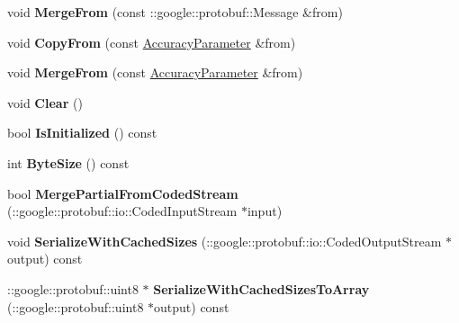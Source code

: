 \begin{DoxyCompactItemize}
\mbox{\label{classcaffe_1_1_accuracy_parameter_a8450a78d36eff284587e92567da36ed6}} 
void {\bfseries Merge\+From} (const \+::google\+::protobuf\+::\+Message \&from)
\item 
\mbox{\label{classcaffe_1_1_accuracy_parameter_acc2fd487a271b0f706f4e8d69ffcee2f}} 
void {\bfseries Copy\+From} (const \mbox{\hyperlink{classcaffe_1_1_accuracy_parameter}{Accuracy\+Parameter}} \&from)
\item 
\mbox{\label{classcaffe_1_1_accuracy_parameter_a3b08be88b78c1291a09c86d1193b34c4}} 
void {\bfseries Merge\+From} (const \mbox{\hyperlink{classcaffe_1_1_accuracy_parameter}{Accuracy\+Parameter}} \&from)
\item 
\mbox{\label{classcaffe_1_1_accuracy_parameter_a057b92b65e706d5093dce1b0b00b9dcf}} 
void {\bfseries Clear} ()
\item 
\mbox{\label{classcaffe_1_1_accuracy_parameter_a806a21aa5524abf91b98aa7bdc1e4aaf}} 
bool {\bfseries Is\+Initialized} () const
\item 
\mbox{\label{classcaffe_1_1_accuracy_parameter_ae5a7598273761de8de02b5b52443c7a1}} 
int {\bfseries Byte\+Size} () const
\item 
\mbox{\label{classcaffe_1_1_accuracy_parameter_ae00aba2c2364902786f84aa69861e7c8}} 
bool {\bfseries Merge\+Partial\+From\+Coded\+Stream} (\+::google\+::protobuf\+::io\+::\+Coded\+Input\+Stream $\ast$input)
\item 
\mbox{\label{classcaffe_1_1_accuracy_parameter_a25be52c598347ec246c7047a0b3c269b}} 
void {\bfseries Serialize\+With\+Cached\+Sizes} (\+::google\+::protobuf\+::io\+::\+Coded\+Output\+Stream $\ast$output) const
\item 
\mbox{\label{classcaffe_1_1_accuracy_parameter_a5176531c53bfe95651e5cd7a8ab62035}} 
\+::google\+::protobuf\+::uint8 $\ast$ {\bfseries Serialize\+With\+Cached\+Sizes\+To\+Array} (\+::google\+::protobuf\+::uint8 $\ast$output) const

\end{DoxyCompactItemize}
